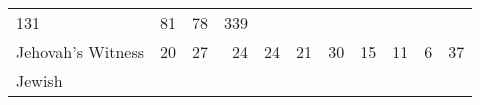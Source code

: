 \documentclass[]{article}
\begin{document}
\begin{longtable}[]{@{}lrrrrrrrrrr@{}}
\begin{minipage}[t]{0.06\columnwidth}
131\strut
\end{minipage} & \begin{minipage}[t]{0.06\columnwidth}\raggedleft\strut
81\strut
\end{minipage} & \begin{minipage}[t]{0.04\columnwidth}\raggedleft\strut
78\strut
\end{minipage} & \begin{minipage}[t]{0.11\columnwidth}\raggedleft\strut
339\strut
\end{minipage}\tabularnewline
\begin{minipage}[t]{0.14\columnwidth}\raggedright\strut
Jehovah's Witness\strut
\end{minipage} & \begin{minipage}[t]{0.04\columnwidth}\raggedleft\strut
20\strut
\end{minipage} & \begin{minipage}[t]{0.05\columnwidth}\raggedleft\strut
27\strut
\end{minipage} & \begin{minipage}[t]{0.05\columnwidth}\raggedleft\strut
24\strut
\end{minipage} & \begin{minipage}[t]{0.05\columnwidth}\raggedleft\strut
24\strut
\end{minipage} & \begin{minipage}[t]{0.05\columnwidth}\raggedleft\strut
21\strut
\end{minipage} & \begin{minipage}[t]{0.05\columnwidth}\raggedleft\strut
30\strut
\end{minipage} & \begin{minipage}[t]{0.06\columnwidth}\raggedleft\strut
15\strut
\end{minipage} & \begin{minipage}[t]{0.06\columnwidth}\raggedleft\strut
11\strut
\end{minipage} & \begin{minipage}[t]{0.04\columnwidth}\raggedleft\strut
6\strut
\end{minipage} & \begin{minipage}[t]{0.11\columnwidth}\raggedleft\strut
37\strut
\end{minipage}\tabularnewline
\begin{minipage}[t]{0.14\columnwidth}\raggedright\strut
Jewish\strut
\end{minipage} & \begin{minipage}[t]{0.04\columnwidth}\raggedleft\strut

\end{minipage}
\end{longtable}
\end{document}
